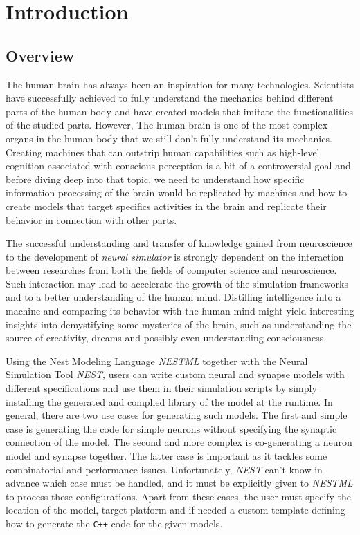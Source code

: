 \chapter{Introduction}

\section{Overview}
The human brain has always been an inspiration for many technologies. Scientists have successfully achieved to fully understand the mechanics behind different parts of the human body and have created models that imitate the functionalities of the studied parts. However, The human brain is one of the most complex organs in the human body \cite{nolte2002human} that we still don’t fully understand its mechanics. Creating machines that can outstrip human capabilities such as high-level cognition associated with conscious perception is a bit of a controversial goal and before diving deep into that topic, we need to understand how specific information processing of the brain would be replicated by machines and how to create models that target specifics activities in the brain and replicate their behavior in connection with other parts.

The successful understanding and transfer of knowledge gained from neuroscience to the development of \emph{neural simulator} is strongly dependent on the interaction between researches from both the fields of computer science and neuroscience. Such interaction may lead to accelerate the growth of the simulation frameworks and to a better understanding of the human mind. Distilling intelligence into a machine and comparing its behavior with the human mind might yield interesting insights into demystifying some mysteries of the brain, such as understanding the source of creativity, dreams and possibly even understanding consciousness.

Using the Nest Modeling Language \emph{NESTML} together with the Neural Simulation Tool \emph{NEST}, users can write custom neural and synapse models with different specifications and use them in their simulation scripts by simply installing the generated and complied library of the model at the runtime. In general, there are two use cases for generating such models. The first and simple case is generating the code for simple neurons without specifying the synaptic connection of the model. The second and more complex is co-generating a neuron model and synapse together. The latter case is important as it tackles some combinatorial and performance issues. Unfortunately, \emph{NEST} can't know in advance which case must be handled, and it must be explicitly given to \emph{NESTML} to process these configurations. Apart from these cases, the user must specify the location of the model, target platform and if needed a custom template defining how to generate the \texttt{C++} code for the given models.

